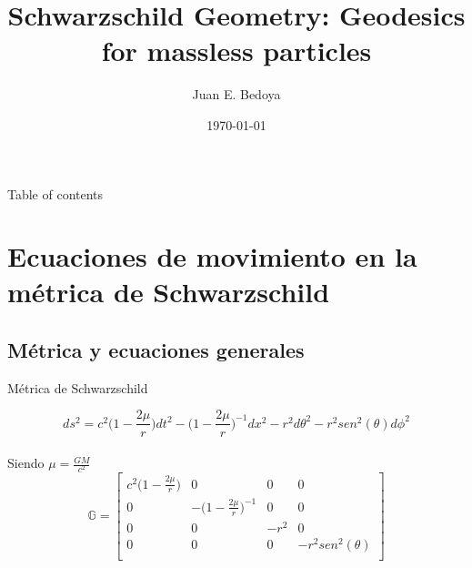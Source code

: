 \documentclass[xcolor=dvipsnames]{beamer}
\title[Schwarzschild geometry]{Schwarzschild Geometry: Geodesics for massless particles}
\date{\today}
\author[Universidad del Valle]{ Juan E. Bedoya }
\institute[]{Universidad del Valle \\ Departamento de física}
\begin{document}
	
	\begin{frame}
		\titlepage
	\end{frame}
	
	\begin{frame}{Table of contents}
    \tableofcontents
	\end{frame}
	
	
	
	\section{Ecuaciones de movimiento en la métrica de Schwarzschild}
	\subsection{Métrica y ecuaciones generales}
	\begin{frame}{Métrica de Schwarzschild}
	    
	    \begin{block}{}

	    \begin{equation*}
	    ds^{2}=c^{2}\Big( 1- \frac{2\mu}{r}\Big) dt^{2}-\Big( 1- \frac{2\mu}{r}\Big)^{-1} dx^{2}-r^{2}d\theta^{2}-r^{2}sen^{2}(\theta)d\phi^{2} 
	    \end{equation*}\\
	   Siendo $\mu=\frac{GM}{c^{2}}$
	\begin{equation*}
	\mathbb{G}= 
      \begin{bmatrix}
      c^{2}\Big( 1- \frac{2\mu}{r}\Big) & 0&0&0\\
      0 &-\Big( 1- \frac{2\mu}{r}\Big)^{-1}&0&0\\
      0&0&-r^{2}&0\\
      0&0&0&-r^{2} sen^{2}(\theta)\\
\end{bmatrix}
\end{equation*}

  \end{block}

	\end{frame}
	
\end{document}
